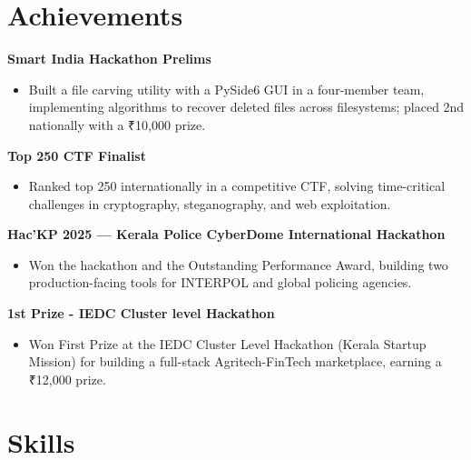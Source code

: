 \documentclass[10pt, a4paper]{article}
\newenvironment{highlights}{
    \begin{itemize}[
        topsep=0.10 cm,
        parsep=0.10 cm,
        partopsep=0pt,
        itemsep=0pt,
        leftmargin=0 cm + 10pt
    ]
}{
    \end{itemize}
} %
\begin{document}
        \vspace{0.01 cm}

    \section{Achievements}

                \textbf{Smart India Hackathon Prelims}
                \begin{highlights}
                    \item Built a file carving utility with a PySide6 GUI in a four-member team, implementing algorithms to recover deleted files across filesystems; placed 2nd nationally with a ₹10,000 prize.
                \end{highlights}
                
\newpage %

                \textbf{Top 250 CTF Finalist}
                \begin{highlights}
                    \item Ranked top 250 internationally in a competitive CTF, solving time-critical challenges in cryptography, steganography, and web exploitation.
                \end{highlights}

                \textbf{Hac'KP 2025 — Kerala Police CyberDome International Hackathon}
                \begin{highlights}
                    \item Won the hackathon and the Outstanding Performance Award, building two production-facing tools for INTERPOL and global policing agencies.
                \end{highlights}

                \textbf{1st Prize - IEDC Cluster level Hackathon}
                \begin{highlights}
                    \item Won First Prize at the IEDC Cluster Level Hackathon (Kerala Startup Mission) for building a full-stack Agritech-FinTech marketplace, earning a ₹12,000 prize.
                \end{highlights}

    \section{Skills}
\end{document}
